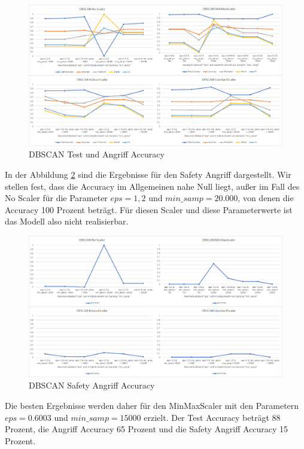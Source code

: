 \documentclass[12pt,a4paper]{scrartcl}
\numberwithin{equation}{section}
\begin{document}
\begin{figure}[ht!]
	\centering
	  \includegraphics[scale=0.5]{dbscan_4.png}
	  \caption{DBSCAN Test und Angriff Accuracy}
	\label{dbscan_results}
\end{figure}

In der Abbildung \ref{sis_dbscan_results} sind die Ergebnisse für den Safety Angriff dargestellt. Wir stellen fest, dass die Accuracy im Allgemeinen nahe Null liegt, außer im Fall des No Scaler für die Parameter $eps = 1,2$ und $min\_samp = 20.000$, von denen die Accuracy 100 Prozent beträgt. Für diesen Scaler und diese Parameterwerte ist das Modell also nicht realisierbar. 

\begin{figure}[ht!]
	\centering
	  \includegraphics[scale=0.45]{sis_dbscan_4.png}
	  \caption{DBSCAN Safety Angriff Accuracy}
	\label{sis_dbscan_results}
\end{figure}

Die besten Ergebnisse werden daher für den MinMaxScaler mit den Parametern $eps = 0.6003$ und $min\_samp = 15000$ erzielt. Der Test Accuracy beträgt 88 Prozent, die Angriff Accuracy 65 Prozent und die Safety Angriff Accuracy 15 Prozent. 
\end{document}
